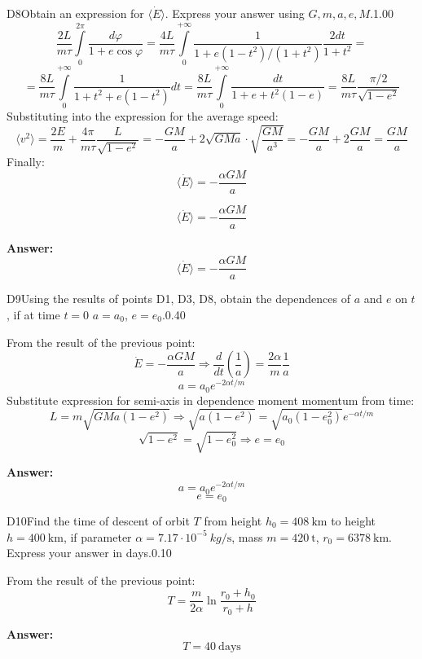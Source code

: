 \documentclass[11pt,a4paper]{article}
\begin{document}
\begin{solcard}{D8}{Obtain an expression for $ \langle\dot E\rangle $. Express your answer using $G, m, a, e, M$.}{1.00}
$$\dfrac{2L}{m\tau}\int\limits_{0}^{2\pi}\dfrac{d\varphi}{1+e\cos{\varphi}}=\dfrac{4L}{m\tau}\int\limits_{0}^{+\infty}\dfrac{1}{1+e(1-t^2)/(1+t^2)}\dfrac{2dt}{1+t^2}=$$ $$=\dfrac{8L}{m\tau}\int\limits_{0}^{+\infty}\dfrac{1}{1+t^2+e(1-t^2)}dt=\dfrac{8L}{m\tau}\int\limits_{0}^{+\infty}\dfrac{dt}{1+e+t^2(1-e)}=\dfrac{8L}{m\tau}\dfrac{\pi/2}{\sqrt{1-e^2}}$$ Substituting into the expression for the average speed: $$\langle v^2 \rangle= \dfrac{2E}{m}+\dfrac{4\pi}{m\tau}\dfrac{L}{\sqrt{1-e^2}}=-\dfrac{GM}{a}+2\sqrt{GMa}\cdot \sqrt{\dfrac{GM}{a^3}}=-\dfrac{GM}{a}+2\dfrac{GM}{a}=\dfrac{GM}{a}$$ Finally: $$\langle \dot E\rangle=-\dfrac{\alpha GM}{a}$$


$$\langle \dot E\rangle=-\dfrac{\alpha GM}{a}$$

\par\smallskip\noindent\textbf{Answer:} $$\langle \dot E\rangle=-\dfrac{\alpha GM}{a}$$
\end{solcard}

\begin{solcard}{D9}{Using the results of points D1, D3, D8, obtain the dependences of $a$ and $e$ on $t$, if at time $t=0$ $a=a_0$, $e=e_0$.}{0.40}

From the result of the previous point: $$\dot E=-\dfrac{\alpha GM}{a} \Rightarrow \dfrac{d}{dt}\left(\dfrac{1}{a}\right)=\dfrac{2\alpha}{m}\dfrac{1}{a}$$ $$a=a_0e^{-2\alpha t/m}$$ Substitute expression for semi-axis in dependence moment momentum from time: $$L=m\sqrt{GMa(1-e^2)}\Rightarrow \sqrt{a(1-e^2)}=\sqrt{a_0(1-e_0^2)}e^{-\alpha t/m}$$ $$\sqrt{1-e^2}=\sqrt{1-e_0^2}\Rightarrow e=e_0$$

\par\smallskip\noindent\textbf{Answer:} $$a=a_0e^{-2\alpha t/m}$$ $$e=e_0$$
\end{solcard}

\begin{solcard}{D10}{Find the time of descent of orbit $T$ from height $h_0=408~\mathrm{km}$ to height $h=400~\mathrm{km}$, if parameter $\alpha=7.17\cdot 10^{-5}~kg/\mathrm{s}$, mass $m = 420~\text{t}$, $r_0=6378~\mathrm{km}$. Express your answer in days.}{0.10}

From the result of the previous point: $$T=\dfrac{m}{2\alpha}\ln\dfrac{r_0+h_0}{r_0+h}$$

\par\smallskip\noindent\textbf{Answer:} $$T = 40~\text{days}$$
\end{solcard}
\end{document}
